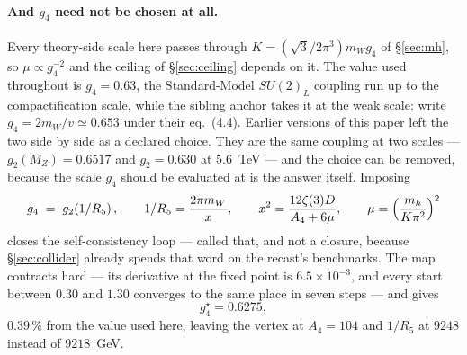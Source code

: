 \documentclass[11pt,a4paper]{article}
\newcommand{\su}[1]{SU(#1)}
\begin{document}
\paragraph{And $g_4$ need not be chosen at all.} Every theory-side scale here passes through
$K=(\sqrt3/2\pi^3)m_Wg_4$ of \S\ref{sec:mh}, so $\mu\propto g_4^{-2}$ and the ceiling of
\S\ref{sec:ceiling} depends on it. The value used throughout is $g_4=0.63$, the Standard-Model
$\su2_L$ coupling run up to the compactification scale, while the sibling anchor takes it at the
weak scale: \cite{AHMN} write $g_4=2m_W/v\simeq0.653$ under their eq.~(4.4). Earlier versions of
this paper left the two side by side as a declared choice. They are the same coupling at two
scales --- $g_2(M_Z)=0.6517$ and $g_2=0.630$ at $5.6$~TeV --- and the choice can be removed, because
the scale $g_4$ should be evaluated at is the answer itself. Imposing
\begin{equation}\label{eq:g4fix}
  g_4\;=\;g_2\!\left(1/R_5\right),\qquad 1/R_5=\frac{2\pi m_W}{x},\qquad
  x^2=\frac{12\zeta(3)D}{A_4+6\mu},\qquad \mu=\Bigl(\frac{m_h}{K\pi^2}\Bigr)^{2}
\end{equation}
closes the self-consistency loop --- called that, and not a closure, because \S\ref{sec:collider}
already spends that word on the recast's benchmarks. The map contracts hard --- its derivative at the fixed point is
$6.5\times10^{-3}$, and every start between $0.30$ and $1.30$ converges to the same place in seven
steps --- and gives
\begin{equation}\label{eq:g4star}
  g_4^\star=0.6275 ,
\end{equation}
$0.39\,\%$ from the value used here, leaving the vertex at $A_4=104$ and $1/R_5$ at $9248$ instead
of $9218$~GeV.
\end{document}

